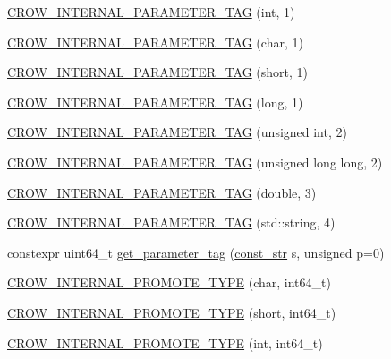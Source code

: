 \begin{DoxyCompactItemize}
\item 
\hyperlink{namespacecrow_1_1black__magic_a264c6694c8fd639b5560f51547eed925}{C\-R\-O\-W\-\_\-\-I\-N\-T\-E\-R\-N\-A\-L\-\_\-\-P\-A\-R\-A\-M\-E\-T\-E\-R\-\_\-\-T\-A\-G} (int, 1)
\item 
\hyperlink{namespacecrow_1_1black__magic_a7121499a9aaba838d1ecb7c5a1039a3f}{C\-R\-O\-W\-\_\-\-I\-N\-T\-E\-R\-N\-A\-L\-\_\-\-P\-A\-R\-A\-M\-E\-T\-E\-R\-\_\-\-T\-A\-G} (char, 1)
\item 
\hyperlink{namespacecrow_1_1black__magic_a5f4e721d7feb011651ccea89470b4423}{C\-R\-O\-W\-\_\-\-I\-N\-T\-E\-R\-N\-A\-L\-\_\-\-P\-A\-R\-A\-M\-E\-T\-E\-R\-\_\-\-T\-A\-G} (short, 1)
\item 
\hyperlink{namespacecrow_1_1black__magic_a77b9d55adaad40f9dbcff155479aa101}{C\-R\-O\-W\-\_\-\-I\-N\-T\-E\-R\-N\-A\-L\-\_\-\-P\-A\-R\-A\-M\-E\-T\-E\-R\-\_\-\-T\-A\-G} (long, 1)
\item 
\hyperlink{namespacecrow_1_1black__magic_a0ef5fc727782f10e3c2b18bb203373f2}{C\-R\-O\-W\-\_\-\-I\-N\-T\-E\-R\-N\-A\-L\-\_\-\-P\-A\-R\-A\-M\-E\-T\-E\-R\-\_\-\-T\-A\-G} (unsigned int, 2)
\item 
\hyperlink{namespacecrow_1_1black__magic_a67e7a4d47de21fd2e1d52c3938587a67}{C\-R\-O\-W\-\_\-\-I\-N\-T\-E\-R\-N\-A\-L\-\_\-\-P\-A\-R\-A\-M\-E\-T\-E\-R\-\_\-\-T\-A\-G} (unsigned long long, 2)
\item 
\hyperlink{namespacecrow_1_1black__magic_a873691f0e99a603d7e59b161a782f10c}{C\-R\-O\-W\-\_\-\-I\-N\-T\-E\-R\-N\-A\-L\-\_\-\-P\-A\-R\-A\-M\-E\-T\-E\-R\-\_\-\-T\-A\-G} (double, 3)
\item 
\hyperlink{namespacecrow_1_1black__magic_aa65db9335b5c3a3058f46ed89fa6207f}{C\-R\-O\-W\-\_\-\-I\-N\-T\-E\-R\-N\-A\-L\-\_\-\-P\-A\-R\-A\-M\-E\-T\-E\-R\-\_\-\-T\-A\-G} (std\-::string, 4)
\item 
constexpr uint64\-\_\-t \hyperlink{namespacecrow_1_1black__magic_a5e101d2f6803b92441aa8beff0f51113}{get\-\_\-parameter\-\_\-tag} (\hyperlink{classcrow_1_1black__magic_1_1const__str}{const\-\_\-str} s, unsigned p=0)
\item 
\hyperlink{namespacecrow_1_1black__magic_a926dc267a9cf598b9b2c99b33577139a}{C\-R\-O\-W\-\_\-\-I\-N\-T\-E\-R\-N\-A\-L\-\_\-\-P\-R\-O\-M\-O\-T\-E\-\_\-\-T\-Y\-P\-E} (char, int64\-\_\-t)
\item 
\hyperlink{namespacecrow_1_1black__magic_a571088fcb303b30757b3399208070677}{C\-R\-O\-W\-\_\-\-I\-N\-T\-E\-R\-N\-A\-L\-\_\-\-P\-R\-O\-M\-O\-T\-E\-\_\-\-T\-Y\-P\-E} (short, int64\-\_\-t)
\item 
\hyperlink{namespacecrow_1_1black__magic_a787da3fb2db6c0c3fc3022812bc02274}{C\-R\-O\-W\-\_\-\-I\-N\-T\-E\-R\-N\-A\-L\-\_\-\-P\-R\-O\-M\-O\-T\-E\-\_\-\-T\-Y\-P\-E} (int, int64\-\_\-t)

\end{DoxyCompactItemize}
